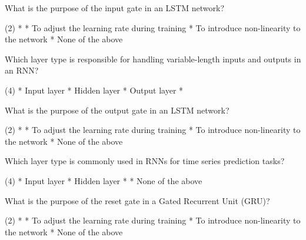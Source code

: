 \documentclass[10pt]{extarticle}
\begin{document}
\begin{exercise}
    What is the purpose of the input gate in an LSTM network?
    \begin{choice} (2)
        * 
        * To adjust the learning rate during training
        * To introduce non-linearity to the network
        * None of the above
    \end{choice}
\end{exercise}
\begin{solution}
\end{solution}

\begin{exercise}
    Which layer type is responsible for handling variable-length inputs and outputs in an RNN?
    \begin{choice} (4)
        * Input layer
        * Hidden layer
        * Output layer
        * 
    \end{choice}
\end{exercise}
\begin{solution}
\end{solution}

\begin{exercise}
    What is the purpose of the output gate in an LSTM network?
    \begin{choice} (2)
        * 
        * To adjust the learning rate during training
        * To introduce non-linearity to the network
        * None of the above
    \end{choice}
\end{exercise}
\begin{solution}
\end{solution}

\begin{exercise}
    Which layer type is commonly used in RNNs for time series prediction tasks?
    \begin{choice} (4)
        * Input layer
        * Hidden layer
        * 
        * None of the above
    \end{choice}
\end{exercise}
\begin{solution}
\end{solution}

\begin{exercise}
    What is the purpose of the reset gate in a Gated Recurrent Unit (GRU)?
    \begin{choice} (2)
        * 
        * To adjust the learning rate during training
        * To introduce non-linearity to the network
        * None of the above
    \end{choice}
\end{exercise}
\begin{solution}
\end{solution}


\newpage
\begin{multicols*}{2}
    \printsolutions*
\end{multicols*}
\end{document}
